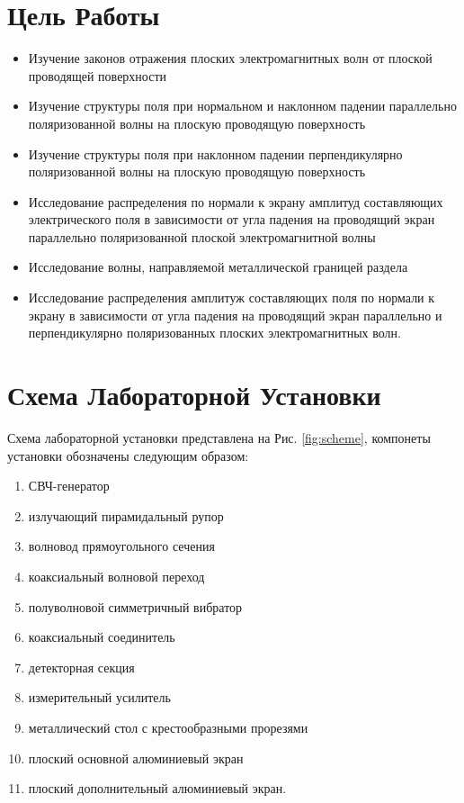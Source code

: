 \documentclass[11pt,a4paper,oneside, titlepage,reqno]{amsproc}
\author{Соколовский Роман}
\begin{document}


\section{Цель Работы}
\begin{itemize}
    \item Изучение законов отражения плоских электромагнитных волн от плоской проводящей
        поверхности
    \item Изучение структуры поля при нормальном и наклонном падении параллельно
        поляризованной волны на плоскую проводящую поверхность
    \item Изучение структуры поля при наклонном падении перпендикулярно поляризованной волны
        на плоскую проводящую поверхность
    \item Исследование распределения по нормали к экрану амплитуд составляющих электрического
        поля в зависимости от угла падения на проводящий экран параллельно поляризованной
        плоской электромагнитной волны
    \item Исследование волны, направляемой металлической границей раздела
    \item Исследование распределения амплитуж составляющих поля по нормали к экрану в
        зависимости от угла падения на проводящий экран параллельно и перпендикулярно
        поляризованных плоских электромагнитных волн.\\
\end{itemize}

\section{Схема Лабораторной Установки}
Схема лабораторной установки представлена на Рис. \ref{fig:scheme},
компонеты установки обозначены следующим образом:
\begin{enumerate}
    \item СВЧ-генератор
    \item излучающий пирамидальный рупор
    \item волновод прямоугольного сечения
    \item коаксиальный волновой переход
    \item полуволновой симметричный вибратор
    \item коаксиальный соединитель
    \item детекторная секция
    \item измерительный усилитель
    \item металлический стол с крестообразными прорезями
    \item плоский основной алюминиевый экран
    \item плоский дополнительный алюминиевый экран.
\end{enumerate}
\end{document}
